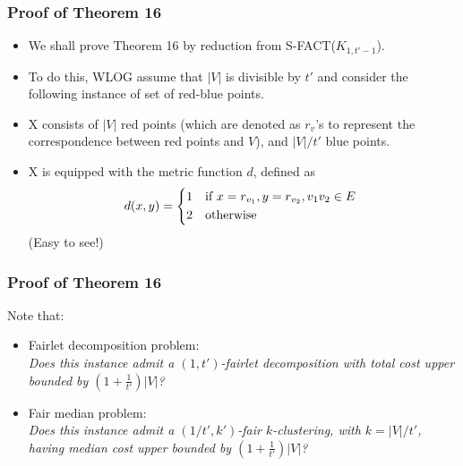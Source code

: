 \documentclass{beamer}
\begin{document}
\begin{frame}
\frametitle{Proof of Theorem 16}

\begin{itemize}
	\item We shall prove Theorem 16 by reduction from \textsc{S-FACT}($K_{1, t' - 1}$).

	\item To do this, WLOG assume that $|V|$ is divisible by $t'$ and consider the following instance of set of red-blue points. \pause
	
	\item X consists of $|V|$ red points (which are denoted as $r_v$'s to represent the correspondence between red points and $V$), and $|V|/t'$ blue points.
	
	\item X is equipped with the metric function $d$, defined as
  \begin{equation*}
    d(x, y) =
    \begin{cases*}
      1 & if $x = r_{v_1}, y = r_{v_2}, v_1 v_2 \in E$ \\
      2        & otherwise
    \end{cases*}
  \end{equation*}
  (Easy to see!)
	
\end{itemize}

\end{frame}



\begin{frame}
\frametitle{Proof of Theorem 16}

Note that:

\begin{itemize}
	\item Fairlet decomposition problem:\\
	{\it Does this instance admit a $(1, t')$-fairlet decomposition with total cost upper bounded by $\left( 1 + \frac{1}{t'} \right) |V|$?}
	
	\item Fair median problem:\\
	{\it Does this instance admit a $(1/t', k')$-fair $k$-clustering, with $k = |V|/t'$, having median cost upper bounded by $\left( 1 + \frac{1}{t'} \right) |V|$?}
	
\end{itemize}


\end{frame}
\end{document}
